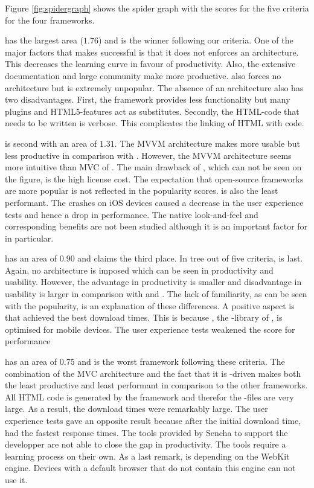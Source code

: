 \documentclass[a4paper]{artikel3}
\begin{document}
Figure \ref{fig:spidergraph} shows the spider graph with the scores for the five criteria for the four frameworks.

\jqma{} has the largest area ($1.76$) and is the winner following our criteria.
One of the major factors that makes \jqma{} successful is that it does not enforces an architecture.
This decreases the learning curve in favour of productivity.
Also,  the extensive documentation and large community make \jqma{} more productive.
\lungo{} also forces no architecture but is extremely unpopular.
The absence of 	an architecture also has two disadvantages.
First,  the framework provides less functionality but many plugins and HTML5-features act as substitutes.
Secondly,  the HTML-code that needs to be written is verbose.
This complicates the linking of HTML with \js{} code.

\kendoa{} is second with an area of $1.31$.
The MVVM architecture makes \kendoa{} more usable but less productive in comparison with \jqma{}.
However,  the MVVM architecture seems more intuitive than MVC of \sta{}.
The main drawback of \kendoa{},  which can not be seen on the figure, is the high license cost.
The expectation that open-source frameworks are more popular is not reflected in the popularity scores.
\kendoa{} is also the least performant.
The crashes on iOS devices caused a decrease in the user experience tests and hence a drop in performance.
The native look-and-feel and corresponding benefits are not been studied although it is an important factor for \kendoa{} in particular.

\lungo{} has an area of $0.90$ and claims the third place.
In tree out of five criteria,  \lungo{} is last.
Again, no architecture is imposed which can be seen in productivity and usability.
However,  the advantage in productivity is smaller and disadvantage in usability is larger in comparison with \sta{} and \kendoa{}.
The lack of familiarity,  as can be seen with the popularity,  is an explanation of these differences.
A positive aspect is that \lungo{} achieved the best download times.  
This is because \quo{},  the \js-library of \lungo{},  is optimised for mobile devices.
The user experience tests weakened the score for performance


\sta {} has an area of $0.75$ and is the worst framework following these criteria.
The combination of the MVC architecture and the fact that it is \js-driven makes \sta{} both the least productive and least performant in comparison to the other frameworks.
All HTML code is generated by the framework and therefor the \js-files are very large.
As a result,  the download times were remarkably large.
The user experience tests gave an opposite result because after the initial download time,  \sta{} had the fastest response times.
The tools provided by Sencha to support the developper are not able to close the gap in productivity.
The tools require a learning process on their own.
As a last remark,  \sta{} is depending on the WebKit engine.
Devices with a default browser that do not contain this engine can not use it.
\end{document}

